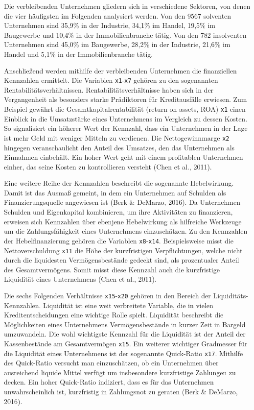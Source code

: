 \documentclass{article}
\begin{document}
Die verbleibenden Unternehmen gliedern sich in verschiedene Sektoren, von denen die vier h{\"a}ufigsten im Folgenden analysiert werden. Von den 9567 solventen Unternehmen sind 35,9\% in der Industrie, 34,1\% im Handel, 19,5\% im Baugewerbe und 10,4\% in der Immobilienbranche t{\"a}tig. Von den 782 insolventen Unternehmen sind 45,0\% im Baugewerbe, 28,2\% in der Industrie, 21,6\% im Handel und 5,1\% in der Immobilienbranche t{\"a}tig.

Anschlie{\ss}end werden mithilfe der verbleibenden Unternehmen die finanziellen Kennzahlen ermittelt. Die Variablen \texttt{x1}-\texttt{x7} geh{\"o}ren zu den sogenannten Rentabilit{\"a}tsverh{\"a}ltnissen. Rentabilit{\"a}tsverh{\"a}ltnisse haben sich in der Vergangenheit als besonders starke Pr{\"a}diktoren f{\"u}r Kreditausf{\"a}lle erwiesen. Zum Beispiel gew{\"a}hrt die Gesamtkapitalrentabilit{\"a}t (return on assets, ROA) \texttt{x1} einen Einblick in die Umsatzst{\"a}rke eines Unternehmens im Vergleich zu dessen Kosten. So signalisiert ein h{\"o}herer Wert der Kennzahl, dass ein Unternehmen in der Lage ist mehr Geld mit weniger Mitteln zu verdienen. Die Nettogewinnmarge \texttt{x2} hingegen veranschaulicht den Anteil des Umsatzes, den das Unternehmen als Einnahmen einbeh{\"a}lt. Ein hoher Wert geht mit einem profitablen Unternehmen einher, das seine Kosten zu kontrollieren versteht (Chen et al., 2011).

Eine weitere Reihe der Kennzahlen beschreibt die sogenannte Hebelwirkung. Damit ist das Ausma{\ss} gemeint, in dem ein Unternehmen auf Schulden als Finanzierungsquelle angewiesen ist (Berk \& DeMarzo, 2016). Da Unternehmen Schulden und Eigenkapital kombinieren, um ihre Aktivit{\"a}ten zu finanzieren, erweisen sich Kennzahlen {\"u}ber ebenjene Hebelwirkung als hilfreiche Werkzeuge um die Zahlungsf{\"a}higkeit eines Unternehmens einzusch{\"a}tzen. Zu den Kennzahlen der Hebelfinanzierung geh{\"o}ren die Variablen \texttt{x8}-\texttt{x14}. Beispielsweise misst die Nettoverschuldung \texttt{x11} die H{\"o}he der kurzfristigen Verpflichtungen, welche nicht durch die liquidesten Verm{\"o}gensbest{\"a}nde gedeckt sind, als prozentualer Anteil des Gesamtverm{\"o}gens. Somit misst diese Kennzahl auch die kurzfristige Liquidit{\"a}t eines Unternehmens (Chen et al., 2011).

Die sechs Folgenden Verh{\"a}ltnisse \texttt{x15}-\texttt{x20} geh{\"o}ren in den Bereich der Liquidit{\"a}ts-Kennzahlen. Liquidit{\"a}t ist eine weit verbreitete Variable, die in vielen Kreditentscheidungen eine wichtige Rolle spielt. Liquidit{\"a}t beschreibt die M{\"o}glichkeiten eines Unternehmens Verm{\"o}gensbest{\"a}nde in kurzer Zeit in Bargeld umzuwandeln. Die wohl wichtigste Kennzahl f{\"u}r die Liquidit{\"a}t ist der Anteil der Kassenbest{\"a}nde am Gesamtverm{\"o}gen \texttt{x15}. Ein weiterer wichtiger Gradmesser f{\"u}r die Liquidit{\"a}t eines Unternehmens ist der sogenannte Quick-Ratio \texttt{x17}. Mithilfe des Quick-Ratio versucht man einzusch{\"a}tzen, ob ein Unternehmen {\"u}ber ausreichend liquide Mittel verf{\"u}gt um insbesondere kurzfristige Zahlungen zu decken. Ein hoher Quick-Ratio indiziert, dass es f{\"u}r das Unternehmen unwahrscheinlich ist, kurzfristig in Zahlungsnot zu geraten (Berk \& DeMarzo, 2016).
\end{document}
